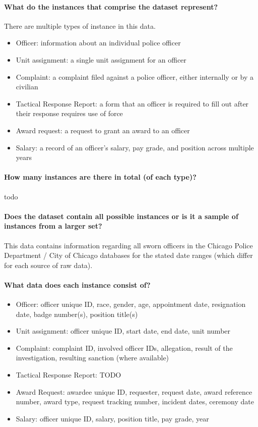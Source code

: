 \paragraph{What do the instances that comprise the dataset represent?}
There are multiple types of instance in this data. 
\begin{itemize}
\item Officer: information about an individual police officer
\item Unit assignment: a single unit assignment for an officer
\item Complaint: a complaint filed against a police officer, either internally or by a civilian
\item Tactical Response Report: a form that an officer is required to fill out after their response requires use of force
\item Award request: a request to grant an award to an officer
\item Salary: a record of an officer's salary, pay grade, and position across multiple years
\end{itemize}

\paragraph{How many instances are there in total (of each type)?}
{\color{red} todo}

\paragraph{Does the dataset contain all possible instances or is it a sample of instances from a larger set?}
This data contains information regarding all sworn officers in the Chicago Police Department / City of Chicago
databases for the stated date ranges (which differ for each source of raw data).

\paragraph{What data does each instance consist of?}
\begin{itemize}
\item Officer: officer unique ID, race, gender, age, appointment date, resignation date, badge number(s), position title(s)
\item Unit assignment: officer unique ID, start date, end date, unit number
\item Complaint: complaint ID, involved officer IDs, allegation, result of the investigation, resulting sanction (where available)
\item Tactical Response Report: {\color{red} TODO}
\item Award Request: awardee unique ID, requester, request date, award reference number, award type, request tracking number, incident dates, ceremony date
\item Salary: officer unique ID, salary, position title, pay grade, year
\end{itemize}


